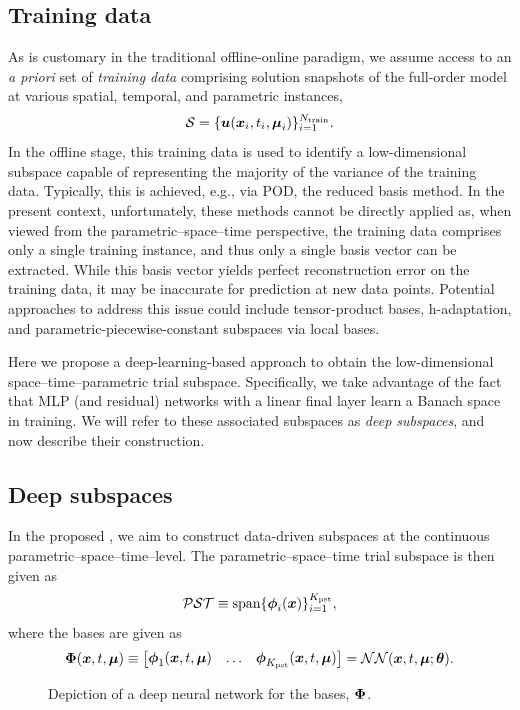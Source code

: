 \documentclass[3p,computermodern,10pt]{elsarticle}
\begin{document}
\subsection{Training data}
As is customary in the traditional offline-online paradigm, we assume access to an \textit{a priori} set of \textit{training data} comprising solution snapshots of the full-order model at various spatial, temporal, and parametric instances,
$$\mathcal{S} = \{\boldsymbol u(\boldsymbol x_i,t_i,\boldsymbol \mu_i) \}_{i=1}^{N_{\text{train}}}.$$ 
In the offline stage, this training data is used to identify a low-dimensional subspace capable of representing the majority of the variance of the training data. Typically, this is achieved, e.g., via POD, the reduced basis method. 
In the present context, unfortunately, these methods cannot be directly applied as, when viewed from the parametric--space--time perspective, the training data comprises only a single training instance, and thus only a single basis vector can be extracted. While this basis vector yields perfect reconstruction error on the training data, it may be inaccurate for prediction at new data points. Potential approaches to address this issue could include tensor-product bases, h-adaptation, and parametric-piecewise-constant subspaces via local bases. 

Here we propose a deep-learning-based approach to obtain the low-dimensional space--time--parametric trial subspace. Specifically, we take advantage of the fact that MLP (and residual) networks with a linear final layer learn a Banach space in training. We will refer to these associated subspaces as \textit{deep subspaces}, and now describe their construction. 
\subsection{Deep subspaces}
In the proposed \MLSubspaceNameLowercase, we aim to construct data-driven subspaces at the continuous parametric--space--time--level. The parametric--space--time trial subspace is then given as
$$\mathcal{PST} \equiv \text{span}\{\boldsymbol \phi_i(\boldsymbol x)\}_{i=1}^{K_{\text{pst}}},$$
where the bases are given as
$$\boldsymbol \Phi (\boldsymbol x, t,\boldsymbol \mu)\equiv \begin{bmatrix} \boldsymbol \phi_1(\boldsymbol x, t,\boldsymbol \mu) &
\hdots & 
 \boldsymbol \phi_{K_{\text{pst}}}(\boldsymbol x, t,\boldsymbol \mu) \end{bmatrix}
= \mathcal{NN}(\boldsymbol x, t,\boldsymbol \mu;\boldsymbol \theta).
$$
\begin{figure}
\begin{center}

\caption{Depiction of a deep neural network for the bases, $\boldsymbol \Phi$.}
\end{center}
\end{figure}
\end{document}
